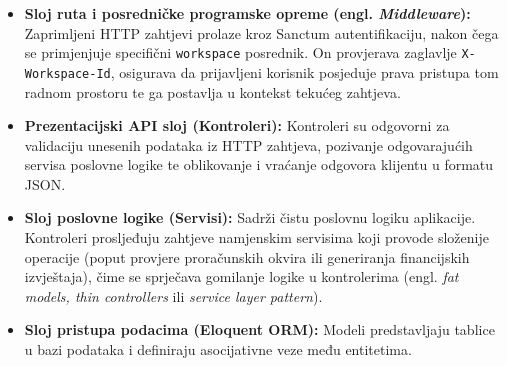\documentclass[a4paper,12pt,oneside]{article}
\begin{document}
	\begin{itemize}
		\item \textbf{Sloj ruta i posredničke programske opreme (engl. \textit{Middleware}):} Zaprimljeni HTTP zahtjevi prolaze kroz Sanctum autentifikaciju, nakon čega se primjenjuje specifični \texttt{workspace} posrednik. On provjerava zaglavlje \texttt{X-Workspace-Id}, osigurava da prijavljeni korisnik posjeduje prava pristupa tom radnom prostoru te ga postavlja u kontekst tekućeg zahtjeva.
		
		\item \textbf{Prezentacijski API sloj (Kontroleri):} Kontroleri su odgovorni za validaciju unesenih podataka iz HTTP zahtjeva, pozivanje odgovarajućih servisa poslovne logike te oblikovanje i vraćanje odgovora klijentu u formatu JSON.
		
		\item \textbf{Sloj poslovne logike (Servisi):} Sadrži čistu poslovnu logiku aplikacije. Kontroleri prosljeđuju zahtjeve namjenskim servisima koji provode složenije operacije (poput provjere proračunskih okvira ili generiranja financijskih izvještaja), čime se sprječava gomilanje logike u kontrolerima (engl. \textit{fat models, thin controllers} ili \textit{service layer pattern}).
		
		\item \textbf{Sloj pristupa podacima (Eloquent ORM):} Modeli predstavljaju tablice u bazi podataka i definiraju asocijativne veze među entitetima.
	\end{itemize}
\end{document}
